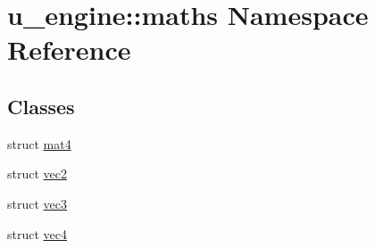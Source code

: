 \hypertarget{namespaceu__engine_1_1maths}{}\section{u\+\_\+engine\+:\+:maths Namespace Reference}
\label{namespaceu__engine_1_1maths}
\subsection*{Classes}
\begin{DoxyCompactItemize}
\item 
struct \hyperlink{structu__engine_1_1maths_1_1mat4}{mat4}
\item 
struct \hyperlink{structu__engine_1_1maths_1_1vec2}{vec2}
\item 
struct \hyperlink{structu__engine_1_1maths_1_1vec3}{vec3}
\item 
struct \hyperlink{structu__engine_1_1maths_1_1vec4}{vec4}
\end{DoxyCompactItemize}
